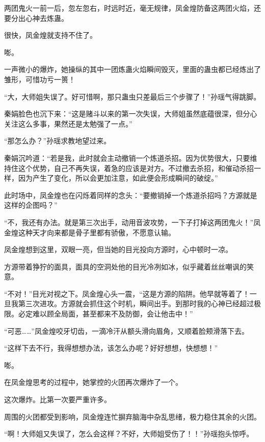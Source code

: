
\begin{this_body}

两团鬼火一前一后，忽左忽右，时远时近，毫无规律，凤金煌防备这两团火焰，还要分出心神去炼蛊。

很快，凤金煌就支持不住了。

嘭。

一声微小的爆炸，她操纵的其中一团炼蛊火焰瞬间毁灭，里面的蛊虫都已经炼出了雏形，可惜功亏一篑！

“大，大师姐失误了。好可惜啊，那只蛊虫只差最后三个步骤了！”孙瑶气得跳脚。

秦娟脸色也沉下来：“这是赌斗以来的第一次失误，大师姐虽然底蕴很深，但分心关注这么多事，果然还是太勉强了一点。”

“那怎么办？”孙瑶求教地望过来。

秦娟沉吟道：“若是我，此时就会主动撤销一个炼道杀招。因为优势很大，只要维持住这个优势，自己不再失误，着急的应该是对方。不过撤去杀招，和催动杀招一样，因为产生了变化，所以会更加注意，如此便会形成瞬间的破绽。”

此时场中，凤金煌也在闪烁着同样的念头：“要撤销掉一个炼道杀招吗？方源就是这样的企图吗？”

“不，我还有办法。就是第三次出手，动用音波攻势，一下子打掉这两团鬼火！”凤金煌这种天才向来都是骨子里都有骄傲，不愿意认输。

凤金煌想到这里，双眼一亮，但当她的目光投向方源时，心中顿时一凉。

方源带着狰狞的面具，面具的空洞处他的目光冷冽如冰，似乎藏着丝丝嘲讽的笑意。

“不对！”目光对视之下。凤金煌心头一震，“这是方源的陷阱。他早就等着了！一旦我第三次进攻。方源就会抓住这个时机，瞬间出手。到那时我的心神已经超过极限。必定难以顾全局面，甚至都来不及防御，会让他击中！”

“可恶……”凤金煌咬牙切齿，一滴冷汗从额头滑向眉角，又顺着脸颊滑落下去。

“这样下去不行，我得想想办法，该怎么办呢？好好想想，快想想！”

嘭。

在凤金煌思考的过程中，她掌控的火团再次爆炸了一个。

这次爆炸。比第一次要严重许多。

周围的火团都受到影响，凤金煌连忙摒弃脑海中杂乱思绪，极力稳住其余的火团。

“啊！大师姐又失误了，怎么会这样？不好，大师姐受伤了！！”孙瑶抱头惊呼。


\end{this_body}
